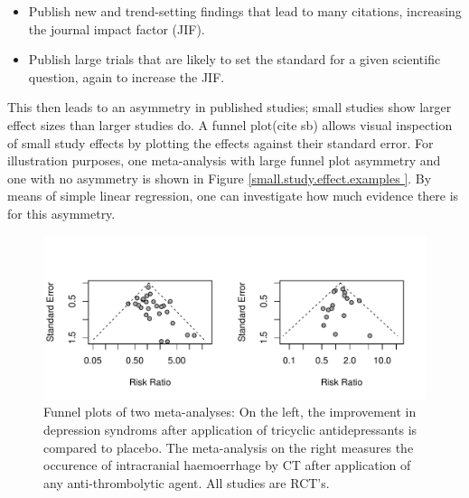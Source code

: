\documentclass[11pt,a4paper,twoside]{book}\usepackage[]{graphicx}\usepackage[]{color}
\makeatletter
\def\maxwidth{ %
  \ifdim\Gin@nat@width>\linewidth
    \linewidth
  \else
    \Gin@nat@width
  \fi
}
\newenvironment{knitrout}{}{} %
\makeatother
\begin{document}
\begin{itemize}
\item Publish new and trend-setting findings that lead to many citations, increasing the journal impact factor (JIF).
\item Publish large trials that are likely to set the standard for a given scientific question, again to increase the JIF.
\end{itemize}

This then leads to an asymmetry in published studies; small studies show larger effect sizes than larger studies do. A funnel plot(cite sb) allows visual inspection of small study effects by plotting the effects against their standard error. For illustration purposes, one meta-analysis with large funnel plot asymmetry and one with no asymmetry is shown in Figure \ref{small.study.effect.examples }. %
By means of simple linear regression, one can investigate how much evidence there is for this asymmetry. 

\begin{figure}
\begin{knitrout}
\color{fgcolor}
\includegraphics[width=\maxwidth]{figure/unnamed-chunk-1-1} 

\end{knitrout}
\caption{Funnel plots of two meta-analyses: On the left, the improvement in depression syndroms after application of tricyclic antidepressants is compared to placebo. The meta-analysis on the right measures the occurence of intracranial haemoerrhage by CT after application of any anti-thrombolytic agent. All studies are RCT's.}
\label{small.study.effect.examples}
\end{figure}
\end{document}
